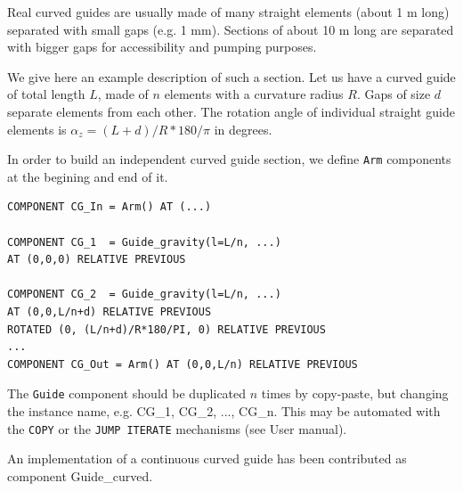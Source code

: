 Real curved guides are usually made of many straight elements (about 1 m long) separated with small gaps (e.g. 1 mm). Sections of about 10 m long are separated with bigger gaps for accessibility and pumping purposes.

We give here an example description of such a section. Let us have a curved guide of total length $L$, made of $n$ elements with a curvature radius $R$. Gaps of size $d$ separate elements from each other. The rotation angle of individual straight guide elements is $\alpha_z = (L+d)/R*180/\pi$ in degrees.

In order to build an independent curved guide section, we define \verb+Arm+ components at the begining and end of it.
\begin{lstlisting}
COMPONENT CG_In = Arm() AT (...)

COMPONENT CG_1  = Guide_gravity(l=L/n, ...)
AT (0,0,0) RELATIVE PREVIOUS

COMPONENT CG_2  = Guide_gravity(l=L/n, ...)
AT (0,0,L/n+d) RELATIVE PREVIOUS
ROTATED (0, (L/n+d)/R*180/PI, 0) RELATIVE PREVIOUS
...
COMPONENT CG_Out = Arm() AT (0,0,L/n) RELATIVE PREVIOUS
\end{lstlisting}
The \verb+Guide+ component should be duplicated $n$ times by copy-paste, but changing the instance name, e.g. CG\_1, CG\_2, ..., CG\_n. This may be automated with the \verb+COPY+ or the \verb+JUMP ITERATE+ mechanisms (see User manual).

An implementation of a continuous curved guide has been contributed as component Guide\_curved.

